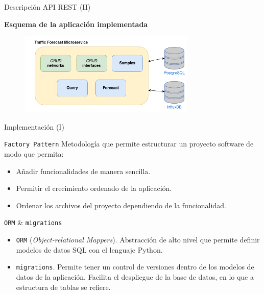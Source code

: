 \documentclass[aspectratio=169,xcolor=dvipsnames]{beamer}
\begin{document}
	
	\begin{frame}{Descripción API REST (II)}
		
		\textbf{Esquema de la aplicación implementada}
		
		\begin{figure}[h!]
			\begin{center}
				\includegraphics[width=0.75\textwidth]{diag/traffic_forecast_schema.png}
			\end{center}
		\end{figure}
	\end{frame}
	
	
	\begin{frame}{Implementación (I)}
		\begin{exampleblock}{\texttt{Factory Pattern}}
			Metodología que permite estructurar un proyecto software de modo que permita:
			\begin{itemize}
				\item Añadir funcionalidades de manera sencilla.
				\item Permitir el crecimiento ordenado de la aplicación.
				\item Ordenar los archivos del proyecto dependiendo de la funcionalidad.
			\end{itemize}
		\end{exampleblock}
	
		\begin{alertblock}{\texttt{ORM} \& \texttt{migrations}}
			\begin{itemize}
				\item \texttt{ORM} (\textit{Object-relational Mappers}). Abstracción de alto nivel que permite definir modelos de datos SQL con el lenguaje Python.
				
				\item \texttt{migrations}. Permite tener un control de versiones dentro de los modelos de datos de la aplicación. Facilita el despliegue de la base de datos, en lo que a estructura de tablas se refiere.	
		\end{itemize}
		\end{alertblock}
		
	\end{frame}
\end{document}
